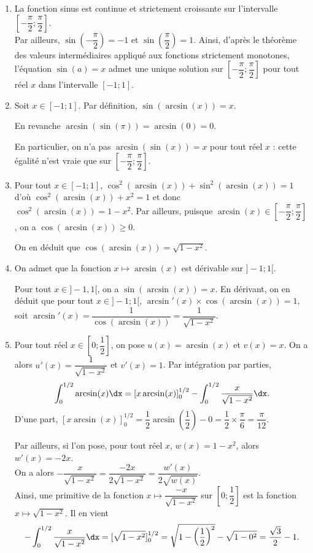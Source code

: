 \documentclass[11pt,fleqn, openany]{book} %
\begin{document}
\begin{solution}\hspace{0pt}
\begin{enumerate}
\item La fonction sinus est continue et strictement croissante sur l'intervalle $\left[-\dfrac{\pi}{2};\dfrac{\pi}{2}\right]$. \\ Par ailleurs, $\sin\left(-\dfrac{\pi}{2}\right)=-1$ et $\sin\left(\dfrac{\pi}{2}\right)=1$. Ainsi, d'après le théorème des valeurs intermédiaires appliqué aux fonctions strictement monotones, l'équation $\sin(a)=x$ admet une unique solution sur $\left[-\dfrac{\pi}{2};\dfrac{\pi}{2}\right]$ pour tout réel $x$ dans l'intervalle $[-1;1]$.
\vskip5pt
\item Soit $x\in [-1;1]$. Par définition, $\sin(\arcsin(x))=x$. 

En revanche $\arcsin(\sin(\pi))=\arcsin(0)=0$. 

En particulier, on n'a pas $\arcsin(\sin(x))=x$ pour tout réel $x$ : cette égalité n'est vraie que sur $\left[-\dfrac{\pi}{2};\dfrac{\pi}{2}\right]$.
\vskip5pt
\item Pour tout $x\in[-1;1]$, $\cos^2(\arcsin(x))+\sin^2(\arcsin(x))=1$ d'où $\cos^2(\arcsin(x))+x^2=1$ et donc  \\ $\cos^2(\arcsin(x))=1-x^2$. Par ailleurs, puisque $\arcsin(x)\in \left[-\dfrac{\pi}{2};\dfrac{\pi}{2}\right]$, on a $\cos(\arcsin(x))\geqslant 0$. 

On en déduit que $\cos(\arcsin(x))=\sqrt{1-x^2}$.
\vskip5pt
\item On admet que la fonction $x\mapsto \arcsin (x)$ est dérivable sur $]-1;1[$. 

Pour tout $x\in]-1,1[$, on a $\sin(\arcsin(x))=x$. En dérivant, on en déduit que pour tout $x\in]-1;1[$, $\arcsin'(x) \times \cos(\arcsin(x))=1,$ soit $\arcsin'(x)=\dfrac{1}{\cos(\arcsin(x))}=\dfrac{1}{\sqrt{1-x^2}}$.
\vskip5pt
\item Pour tout réel $x\in \left[0;\dfrac{1}{2}\right]$, on pose $u(x)=\arcsin(x)$ et $v(x)=x$. On a alors $u'(x)=\dfrac{1}{\sqrt{1-x^2}}$ et $v'(x)=1$. Par intégration par parties,
\[\displaystyle\int_0^{1/2} \arcsin(x) \dx = \left[x\arcsin(x)\right]_0^{1/2}-\int_0^{1/2}\dfrac{x}{\sqrt{1-x^2}}\dx.\]
D'une part, $\left[x\arcsin(x)\right]_0^{1/2} = \dfrac{1}{2}\arcsin\left(\dfrac{1}{2}\right)-0=\dfrac{1}{2}\times \dfrac{\pi}{6}=\dfrac{\pi}{12}$. 

Par ailleurs, si l'on pose, pour tout réel $x$, $w(x)=1-x^2$, alors $w'(x)=-2x$. \\ On a alors $-\dfrac{x}{\sqrt{1-x^2}}=\dfrac{-2x}{2\sqrt{1-x^2}}=\dfrac{w'(x)}{2\sqrt{w(x)}}$. \\ Ainsi, une primitive de la fonction $x\mapsto \dfrac{-x}{\sqrt{1-x^2}}$ sur $\left[0;\dfrac{1}{2}\right]$ est la fonction $x \mapsto \sqrt{1-x^2}$. Il en vient
\[-\int_0^{1/2}\dfrac{x}{\sqrt{1-x^2}}\dx=[\sqrt{1-x^2}]_0^{1/2}=\sqrt{1-\left(\dfrac{1}{2}\right)^2}-\sqrt{1-0^2}=\dfrac{\sqrt{3}}{2}-1.\]


\end{enumerate}
\end{solution}
\end{document}
